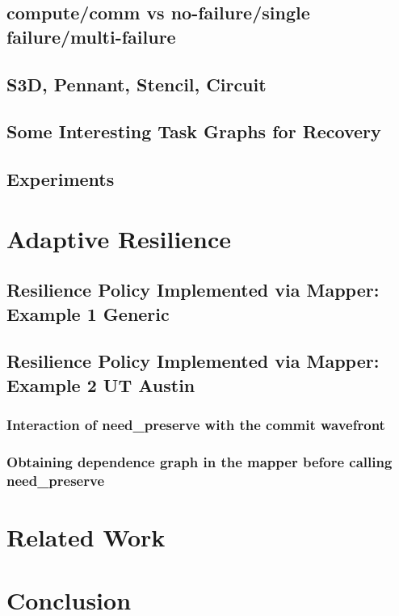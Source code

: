 \documentclass{llncs}
\begin{document}
\subsection{compute/comm vs no-failure/single failure/multi-failure}

\subsection{S3D, Pennant, Stencil, Circuit}

\subsection{Some Interesting Task Graphs for Recovery}


\subsection{Experiments}

\section{Adaptive Resilience}

\subsection{Resilience Policy Implemented via Mapper: Example 1 Generic}

\subsection{Resilience Policy Implemented via Mapper: Example 2 UT Austin}
\subsubsection{Interaction of need\_preserve with the commit wavefront}
\subsubsection{Obtaining dependence graph in the mapper before calling need\_preserve} 

\section{Related Work}

\section{Conclusion}
\end{document}
